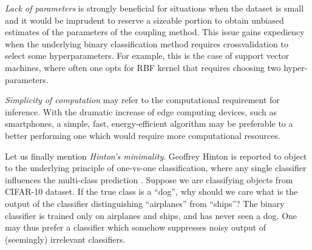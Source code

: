 \emph{Lack of parameters} is strongly beneficial for situations when the dataset is small and it would be imprudent to reserve a sizeable portion to obtain unbiased estimates of the parameters of the coupling method. This issue gains expediency when the underlying binary classification method requires crossvalidation to select some hyperparameters. For example, this is the case of support vector machines, where often one opts for RBF kernel that requires choosing two hyper-parameters. 

\emph{Simplicity of computation}  may refer to the computational requirement for inference. With the dramatic increase of edge computing devices, such as smartphones, a simple, fast, energy-efficient algorithm may be preferable to a better performing one which would require more computational resources. 

Let us finally mention \emph{Hinton's minimality}. Geoffrey Hinton is reported to object to the underlying principle of one-vs-one classification, where any single classifier influences the multi-class prediction \cite[p.~467]{hastie1998classification}. Suppose we are classifying objects from CIFAR-10 dataset.  If the true class is  a ``dog'', why should we care what is the output of the classifier distinguishing ``airplanes'' from ``ships''? The binary classifier is trained only on airplanes and ships, and has never seen a dog. One may thus prefer a classifier which somehow suppresses noisy output of (seemingly) irrelevant classifiers.



